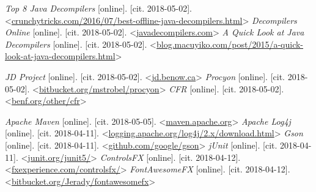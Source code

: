 \begin{thebibliography}{99}
 {\it Top 8 Java Decompilers} [online]. [cit. 2018-05-02]. \textless\url{crunchytricks.com/2016/07/best-offline-java-decompilers.html}\textgreater
{} {\it Decompilers Online} [online]. [cit. 2018-05-02]. \textless\url{javadecompilers.com}\textgreater
{} {\it A Quick Look at Java Decompilers} [online]. [cit. 2018-05-02]. \textless\url{blog.macuyiko.com/post/2015/a-quick-look-at-java-decompilers.html}\textgreater

 {\it JD Project} [online]. [cit. 2018-05-02]. \textless\url{jd.benow.ca}\textgreater
{} {\it Procyon} [online]. [cit. 2018-05-02]. \textless\url{bitbucket.org/mstrobel/procyon}\textgreater
{} {\it CFR} [online]. [cit. 2018-05-02]. \textless\url{benf.org/other/cfr}\textgreater

 {\it Apache Maven} [online]. [cit. 2018-05-05]. \textless\url{maven.apache.org}\textgreater
{} {\it Apache Log4j} [online]. [cit. 2018-04-11]. \textless\url{logging.apache.org/log4j/2.x/download.html}\textgreater
{} {\it Gson} [online]. [cit. 2018-04-11]. \textless\url{github.com/google/gson}\textgreater
{} {\it jUnit} [online]. [cit. 2018-04-11]. \textless\url{junit.org/junit5/}\textgreater
{} {\it ControlsFX} [online]. [cit. 2018-04-12]. \textless\url{fxexperience.com/controlsfx/}\textgreater
{} {\it FontAwesomeFX} [online]. [cit. 2018-04-12]. \textless\url{bitbucket.org/Jerady/fontawesomefx}\textgreater




\end{thebibliography}
